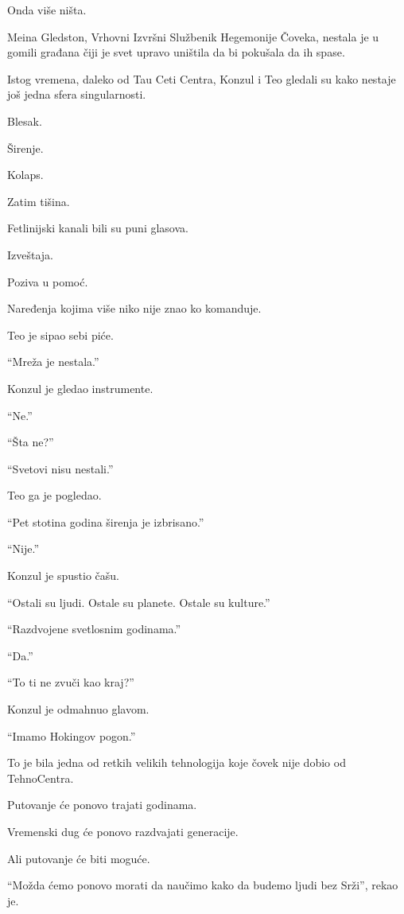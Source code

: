 Onda više ništa.

\bigskip

Meina Gledston, Vrhovni Izvršni Službenik Hegemonije Čoveka, nestala je u gomili građana čiji je svet upravo uništila da bi pokušala da ih spase.

\bigskip

Istog vremena, daleko od Tau Ceti Centra, Konzul i Teo gledali su kako nestaje još jedna sfera singularnosti.

Blesak.

Širenje.

Kolaps.

Zatim tišina.

Fetlinijski kanali bili su puni glasova.

Izveštaja.

Poziva u pomoć.

Naređenja kojima više niko nije znao ko komanduje.

\bigskip

Teo je sipao sebi piće.

``Mreža je nestala.''

Konzul je gledao instrumente.

``Ne.''

``Šta ne?''

``Svetovi nisu nestali.''

Teo ga je pogledao.

``Pet stotina godina širenja je izbrisano.''

``Nije.''

Konzul je spustio čašu.

``Ostali su ljudi. Ostale su planete. Ostale su kulture.''

``Razdvojene svetlosnim godinama.''

``Da.''

``To ti ne zvuči kao kraj?''

Konzul je odmahnuo glavom.

``Imamo Hokingov pogon.''

To je bila jedna od retkih velikih tehnologija koje čovek nije dobio od TehnoCentra.

Putovanje će ponovo trajati godinama.

Vremenski dug će ponovo razdvajati generacije.

Ali putovanje će biti moguće.

``Možda ćemo ponovo morati da naučimo kako da budemo ljudi bez Srži'', rekao je.

\bigskip

